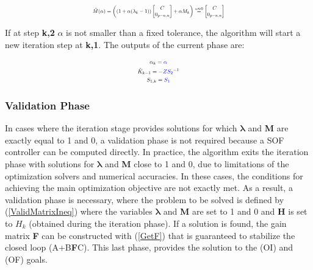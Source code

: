 \vspace{-0.5cm}


\begin{equation}
\resizebox{0.45\textwidth}{!}{$
    \begin{gathered}
        \hat{M}(\alpha) = \left((1+\alpha (\lambda_k-1))
        \begin{bmatrix}
            C \\
            0_{p-n,n}
        \end{bmatrix}
        + 
        \alpha M_k\right)
        \stackrel{\alpha \approx 0 }{=}
        \begin{bmatrix}
            C \\
            0_{p-n,n}
        \end{bmatrix}
    \end{gathered}$}
    \label{Artificiu3}
\end{equation}

If at step \textbf{k,2} $\alpha$ is not smaller than a fixed tolerance, the algorithm will start a new iteration step at \textbf{k,1}. The outputs of the current phase are:

\begin{equation}
\resizebox{0.14\textwidth}{!}{$
    \begin{gathered}
\alpha_k=\textcolor{blue}{\alpha}  \\
        \hat{K}_{k-1} = -\textcolor{blue}{Z} \textcolor{blue}{S_2}^{-1} \\
        S_{1,k} = \textcolor{blue}{S_1}
    \end{gathered}$}
    \label{OutputsIterStap1}
\end{equation}

\subsubsection{Validation Phase}

In cases where the iteration stage provides solutions for which $\pmb{\lambda}$ and \textbf{M} are exactly equal to 1 and 0, a validation phase is not required because a SOF controller can be computed directly. In practice, the algorithm exits the iteration phase with solutions for $\pmb{\lambda}$ and \textbf{M} close to 1 and 0, due to limitations of the optimization solvers and numerical accuracies. In these cases, the conditions for achieving the main optimization objective are not exactly met. As a result, a validation phase is necessary, where the problem to be solved is defined by (\ref{ValidMatrixIneq}) where the variables $\pmb{\lambda}$ and \textbf{M} are set to 1 and 0 and \textbf{H} is set to $H_k$ (obtained during the iteration phase). If a solution is found, the gain matrix \textbf{F} can be constructed with (\ref{GetF}) that is guaranteed to stabilize the closed loop (A+B\textbf{F}C). This last phase, provides the solution to the (OI) and (OF) goals. 


